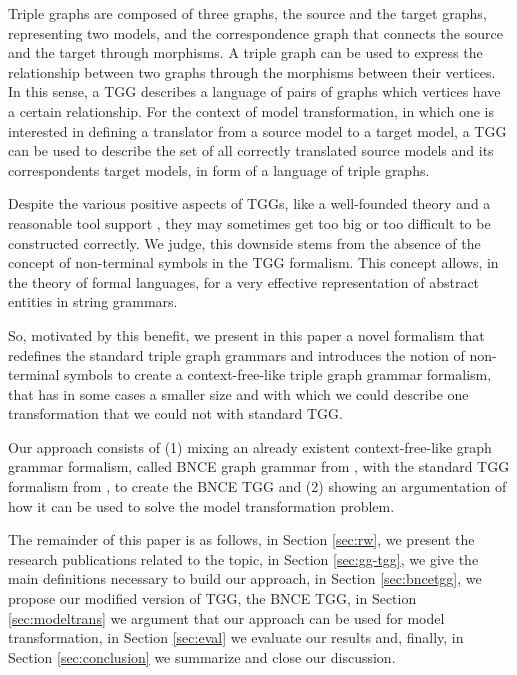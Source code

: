 \documentclass[runningheads]{llncs}
\begin{document}
Triple graphs are composed of three graphs, the source and the target graphs, representing two models, and the correspondence graph that connects the source and the target through morphisms. A triple graph can be used to express the relationship between two graphs through the morphisms between their vertices. In this sense, a TGG describes a language of pairs of graphs which vertices have a certain relationship. For the context of model transformation, in which one is interested in defining a translator from a source model to a target model, a TGG can be used to describe the set of all correctly translated source models and its correspondents target models, in form of a language of triple graphs.

Despite the various positive aspects of TGGs, like a well-founded theory and a reasonable tool support \cite{anjorin201620}, they may sometimes get too big or too difficult to be constructed correctly. We judge, this downside stems from the absence of the concept of non-terminal symbols in the TGG formalism. This concept allows, in the theory of formal languages, for a very effective representation of abstract entities in string grammars.

So, motivated by this benefit, we present in this paper a novel formalism that redefines the standard triple graph grammars and introduces the notion of non-terminal symbols to create a context-free-like triple graph grammar formalism, that has in some cases a smaller size and with which we could describe one transformation that we could not with standard TGG.

Our approach consists of (1) mixing an already existent context-free-like graph grammar formalism, called BNCE graph grammar from \cite{janssens1982graph}, with the standard TGG formalism from \cite{schurr1994specification}, to create the BNCE TGG and (2) showing an argumentation of how it can be used to solve the model transformation problem.

The remainder of this paper is as follows, in Section \ref{sec:rw}, we present the research publications related to the topic, in Section \ref{sec:gg-tgg}, we give the main definitions necessary to build our approach, in Section \ref{sec:bncetgg}, we propose our modified version of TGG, the BNCE TGG, in Section \ref{sec:modeltrans} we argument that our approach can be used for model transformation, in Section \ref{sec:eval} we evaluate our results and, finally, in Section \ref{sec:conclusion} we summarize and close our discussion.
\end{document}

